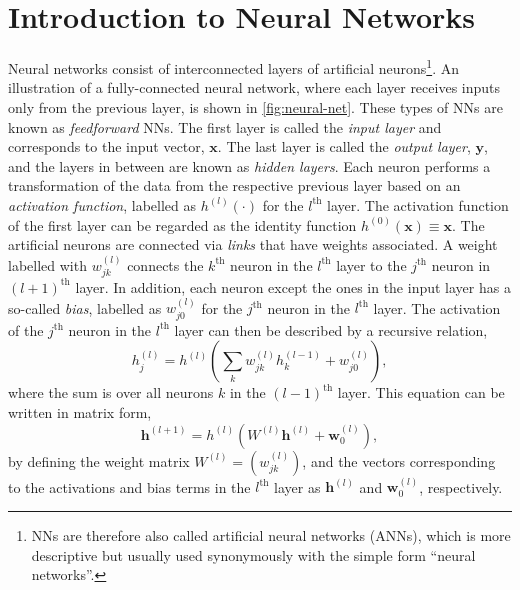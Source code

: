 \section{Introduction to Neural Networks}
Neural networks consist of interconnected layers of artificial neurons\footnote{ NNs are therefore also called artificial neural networks (ANNs), which is more descriptive but usually used synonymously with the simple form ``neural networks''.}. An illustration of a fully-connected neural network, where each layer receives inputs only from the previous layer, is shown in \cref{fig:neural-net}. These types of NNs are known as \emph{feedforward} NNs.
The first layer is called the \emph{input layer} and corresponds to the input vector, $\mathbf{x}$. The last layer is called the \emph{output layer}, $\mathbf{y}$, and the layers in between are known as \emph{hidden layers}. Each neuron performs a transformation of the data from the respective previous layer based on an \emph{activation function}, labelled as $h^{(l)}(\cdot)$ for the $l^\text{th}$ layer.
The activation function of the first layer can be regarded as the identity function $h^{(0)}(\mathbf{x}) \equiv \mathbf{x}$.
The artificial neurons are connected via \emph{links} that have weights associated.
A weight labelled with $w^{(l)}_{jk}$ connects the $k^\text{th}$ neuron in the $l^\text{th}$ layer to the $j^\text{th}$ neuron in $(l+1)^\text{th}$ layer.
In addition, each neuron except the ones in the input layer has a so-called \emph{bias}, labelled as $w^{(l)}_{j0}$ for the $j^\text{th}$ neuron in the $l^\text{th}$ layer.
The activation of the $j^\text{th}$ neuron in the $l^{\text{th}}$ layer can then be described by a recursive relation,
\begin{equation}
    h^{(l)}_j =  h^{(l)} \left( \sum_{k}   w^{(l)}_{jk} h^{(l-1)}_{k}  + w^{(l)}_{j0} \right),
\end{equation}
where the sum is over all neurons $k$ in the $(l-1)^\text{th}$ layer.
This equation can be written in matrix form,
\begin{equation}
    \mathbf{h}^{(l+1)} =  h^{(l)} \left( W^{(l)} \mathbf{h}^{(l)}  + \mathbf{w}^{(l)}_{0} \right),
\end{equation}
by defining the weight matrix $W^{(l)} = \left(w^{(l)}_{jk} \right)$, and the vectors corresponding to the activations and bias terms in the $l^\text{th}$ layer as $\mathbf{h}^{(l)}$ and  $\mathbf{w}^{(l)}_0$, respectively.
